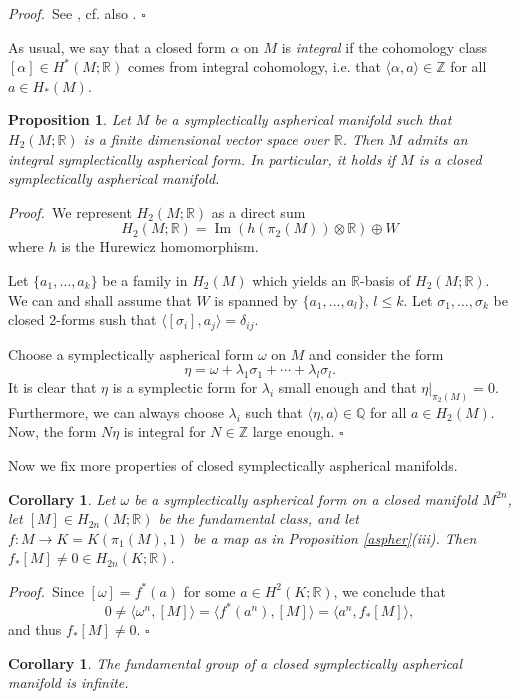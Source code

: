 \documentclass[12pt, twoside]{amsart}
\theoremstyle{plain}
\newtheorem{prop}[theorem]{Proposition}
\newtheorem{cory}[theorem]{Corollary}
\theoremstyle{definition}
\numberwithin{equation}{section}
\def\QQ{\mathbb Q}
\def\QQ{\mathbb Q}
\def\RR{\mathbb R}
\def\ZZ{\mathbb Z}
\def\Im{\operatorname {Im}}
\def\hqed{\hfill\hfill$\square$}
\def\la{\langle}
\def\ra{\rangle}
\def\ga{\alpha}
\def\gl{\lambda}
\def\gs{\sigma}
\def\QQ{\mathbb Q}
\def\RR{\mathbb R}
\def\ZZ{\mathbb Z}
\def\m{\medskip}
\def\p{{\it Proof.\ }}
\begin{document}
\p  See \cite[Corollary 2.2]{RT}, cf. also \cite[Lemma 4.2]{LO}.
\hqed

\m As usual, we say that a closed form $\ga$ on $M$ is {\it integral} if the 
cohomology class $[\ga]\in H^*(M;\RR)$ comes from integral cohomology, i.e. 
that 
$\la \ga, a\ra \in \ZZ$ for all $a\in H_*(M)$.

\begin{prop}\label{integral}
Let $M$ be a symplectically aspherical manifold such that $H_2(M;\RR)$ is a 
finite dimensional vector space over $\RR$. Then $M$ admits an integral 
symplectically aspherical form. In particular, it holds if $M$ is a closed 
symplectically aspherical manifold.
\end{prop}

\p We represent $H_2(M;\RR)$ as a direct sum 
$$
H_2(M;\RR)=\Im(h(\pi_2(M))\otimes \RR)\oplus W
$$ 
where $h$ is the Hurewicz homomorphism. 

Let $\{a_1, \ldots , a_k\}$ be a family in $H_{2}(M)$ which yields an 
$\RR$-basis of $H_2(M;\RR)$. We can and shall assume that $W$ is spanned by 
$\{a_1, \ldots, a_l\}$, $l\le k$. Let $\gs_1, \ldots, \gs_k$ be closed 2-forms 
sush that $\la [\gs_i], a_j\ra=\delta_{ij}$. 

Choose a symplectically aspherical form $\omega$ on $M$ and consider the form 
$$
\eta=\omega + \gl_1\gs_1+\cdots + \gl_l\gs_l.
$$
It is clear that $\eta$ is a symplectic form for $\gl_i$ small enough and that 
$\eta|_{\pi_2(M)}=0$. Furthermore, we can always choose $\gl_i$ such that $\la 
\eta, a\ra\in \QQ$ for all $a\in H_2(M)$. Now, the form $N\eta$ is integral 
for 
$N\in \ZZ$ large enough.    
\hqed

\m Now we fix more properties of closed symplectically aspherical manifolds. 

\begin{cory}\label{fundclass}
Let $\omega$ be a symplectically aspherical form on a closed manifold 
$M^{2n}$, 
let $[M]\in H_{2n}(M;\RR)$ be the fundamental class,  and let $f: M \to 
K=K(\pi_1(M),1)$ be a map as in Proposition {\rm \ref{aspher}(iii)}. Then 
$f_*[M]\ne 0 \in H_{2n}(K;\RR)$. 
\end{cory}

\p Since $[\omega]=f^*(a)$ for some $a\in H^{2}(K;\RR)$, we conclude that
$$
0\ne \la \omega^n, [M]\ra= \la f^*(a^n), [M]\ra =\la a^n, f_*[M]\ra,
$$
and thus $f_*[M]\ne 0$. 
\hqed

\begin{cory}
The fundamental group of a closed symplectically aspherical manifold is 
infinite.
\end{cory}
\end{document}
